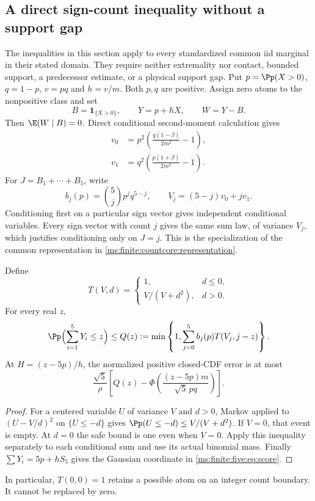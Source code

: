 \subsection{A direct sign-count inequality without a support gap}
\label{ms:finite:five:sec:gapfree}

The inequalities in this section apply to every standardized common iid
marginal in their stated domain. They require neither extremality nor
contact, bounded support, a predecessor estimate, or a physical support gap.
Put $p=\Pp(X>0)$, $q=1-p$, $v=pq$ and $h=v/m$.
Both $p,q$ are positive. Assign zero atoms to the nonpositive class and set
\[
 B=\mathbf 1_{\{X>0\}},\qquad Y=p+hX,\qquad W=Y-B.
\]
Then $\E(W\mid B)=0$. Direct conditional second-moment calculation gives
\begin{align}
 v_0&=p^2\left(\frac{q(1-\beta)}{2m^2}-1\right),
       \label{ms:finite:five:eq:v0}\\
 v_1&=q^2\left(\frac{p(1+\beta)}{2m^2}-1\right).
       \label{ms:finite:five:eq:v1}
\end{align}
For $J=B_1+\cdots+B_5$, write
\[
 b_j(p)=\binom5j p^jq^{5-j},\qquad
 V_j=(5-j)v_0+jv_1.
\]
Conditioning first on a particular sign vector gives independent
conditional variables. Every sign vector with count $j$ gives the same
sum law, of variance $V_j$, which justifies conditioning only on $J=j$.
This is the specialization of the common representation in
\eqref{ms:finite:countcore:representation}.

\begin{lemma}\label{ms:finite:five:lem:cantelli}
Define
\[
 T(V,d)=\begin{cases}1,&d\le0,\\ V/(V+d^2),&d>0.\end{cases}
\]
For every real $z$,
\begin{equation}\label{ms:finite:five:eq:count}
 \Pp\Bigl(\sum_{i=1}^5Y_i\le z\Bigr)
 \le Q(z):=\min\left\{1,\sum_{j=0}^5b_j(p)T(V_j,j-z)\right\}.
\end{equation}
At $H=(z-5p)/h$, the normalized positive closed-CDF error is at most
\begin{equation}\label{ms:finite:five:eq:score}
 \frac{\sqrt5}{\rho}
 \left[Q(z)-\Phi\left(\frac{(z-5p)m}{\sqrt5\,pq}\right)\right].
\end{equation}
\end{lemma}
\begin{proof}
For a centered variable $U$ of variance $V$ and $d>0$, Markov applied to
$(U-V/d)^2$ on $\{U\le-d\}$ gives
$\Pp(U\le-d)\le V/(V+d^2)$. If $V=0$, that event is empty.
At $d=0$ the safe bound is one even when $V=0$. Apply this inequality
separately to each conditional sum and use its actual binomial mass.
Finally $\sum Y_i=5p+hS_5$ gives the Gaussian coordinate in
\eqref{ms:finite:five:eq:score}.
\end{proof}
In particular, $T(0,0)=1$ retains a possible atom on an integer count
boundary. It cannot be replaced by zero.

